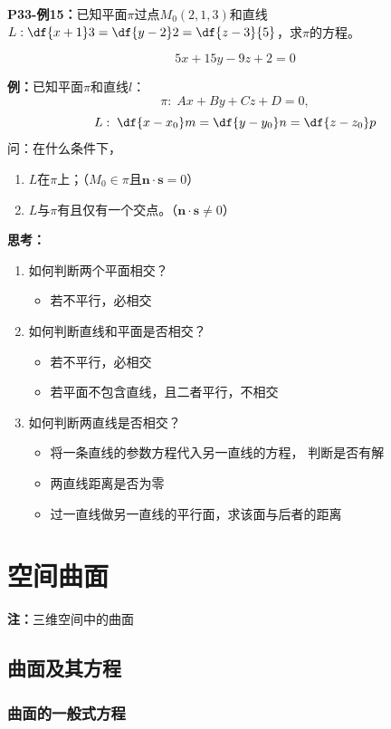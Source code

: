 {\bf P33-例15：}已知平面$\pi$过点$M_0(2,1,3)$和直线
$L:\df{x+1}3=\df{y-2}2=\df{z-3}{5}$，求$\pi$的方程。

$$5x+15y-9z+2=0$$

{\bf 例：}已知平面$\pi$和直线$l$：
$$\pi:\;Ax+By+Cz+D=0,$$
$$L:\;\df{x-x_0}m=\df{y-y_0}n=\df{z-z_0}p$$
问：在什么条件下，
\begin{enumerate}[(1)]
  \setlength{\itemindent}{1cm}
  \item $L$在$\pi$上；\hfill（$M_0\in\pi$且$\bm{n}\cdot\bm{s}=0$）
  \item $L$与$\pi$有且仅有一个交点。\hfill（$\bm{n}\cdot\bm{s}\ne0$）
\end{enumerate}

{\bf 思考：}

\begin{enumerate}[(1)]
  \setlength{\itemindent}{1cm}
  \item 如何判断两个平面相交？
  \begin{itemize}
    \item 若不平行，必相交
  \end{itemize}
  \item 如何判断直线和平面是否相交？
  \begin{itemize}
    \item 若不平行，必相交
    \item 若平面不包含直线，且二者平行，不相交
  \end{itemize}
  \item 如何判断两直线是否相交？
  \begin{itemize}
    \item 将一条直线的参数方程代入另一直线的方程，
    判断是否有解
    \item 两直线距离是否为零
    \item 过一直线做另一直线的平行面，求该面与后者的距离
  \end{itemize}
\end{enumerate}

\section{空间曲面}

{\bf 注：}三维空间中的曲面

\subsection{曲面及其方程}

\subsubsection{曲面的一般式方程}

